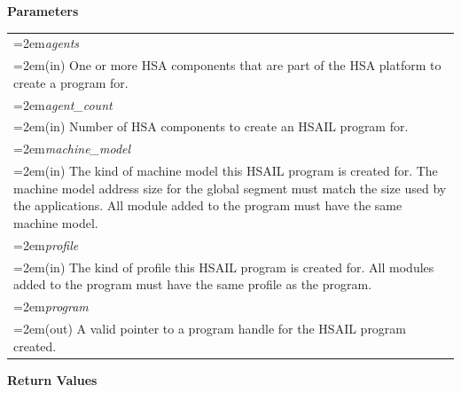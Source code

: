 \documentclass[final]{book}
\newcommand{\hsaarg}[1]{\textit{#1}}
\begin{document}
\noindent\textbf{Parameters}\\[-6mm]
\noindent\begin{longtable}{@{}>{\hangindent=2em}p{\textwidth}}
\hsaarg{agents}\\\hspace{2em}(in) One or more HSA components that are part of the HSA platform to create a program for.\\[2mm]
\hsaarg{agent_\-count}\\\hspace{2em}(in) Number of HSA components to create an HSAIL program for.\\[2mm]
\hsaarg{machine_\-model}\\\hspace{2em}(in) The kind of machine model this HSAIL program is created for. The machine model address size for the global segment must match the size used by the applications. All module added to the program must have the same machine model.\\[2mm]
\hsaarg{profile}\\\hspace{2em}(in) The kind of profile this HSAIL program is created for. All modules added to the program must have the same profile as the program.\\[2mm]
\hsaarg{program}\\\hspace{2em}(out) A valid pointer to a program handle for the HSAIL program created.
\end{longtable}
\vspace{-5mm}\noindent\textbf{Return Values}\\[-6mm]
\end{document}
